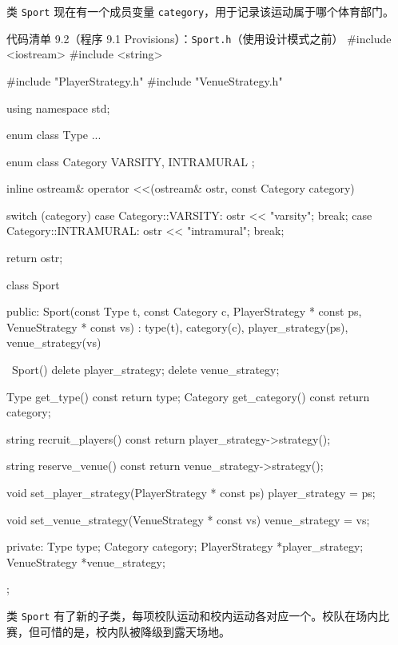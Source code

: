 类 \texttt{Sport} 现在有一个成员变量 \texttt{category}，用于记录该运动属于哪个体育部门。

\begin{codeboxt}{代码清单 9.2（程序 9.1 Provisions）：\texttt{Sport.h}（使用设计模式之前）}
#include <iostream>
#include <string>

#include "PlayerStrategy.h"
#include "VenueStrategy.h"

using namespace std;

enum class Type ...

enum class Category { VARSITY, INTRAMURAL };

inline ostream& operator <<(ostream& ostr, const Category category)
{
    switch (category)
    {
        case Category::VARSITY:    ostr << "varsity";    break;
        case Category::INTRAMURAL: ostr << "intramural"; break;
    }

    return ostr;
}

class Sport
{
public:
    Sport(const Type t, const Category c,
          PlayerStrategy * const ps, VenueStrategy * const vs)
        : type(t), category(c),
          player_strategy(ps), venue_strategy(vs) {}

    ~Sport()
    {
        delete player_strategy;
        delete venue_strategy;
    }

    Type     get_type()     const { return type; }
    Category get_category() const { return category; }

    string recruit_players() const
    {
        return player_strategy->strategy();
    }

    string reserve_venue() const
    {
        return venue_strategy->strategy();
    }

    void set_player_strategy(PlayerStrategy * const ps)
    {
        player_strategy = ps;
    }

    void set_venue_strategy(VenueStrategy * const vs)
    {
        venue_strategy = vs;
    }

private:
    Type type;
    Category category;
    PlayerStrategy *player_strategy;
    VenueStrategy  *venue_strategy;
};
\end{codeboxt}

类 \texttt{Sport} 有了新的子类，每项校队运动和校内运动各对应一个。校队在场内比赛，但可惜的是，校内队被降级到露天场地。

